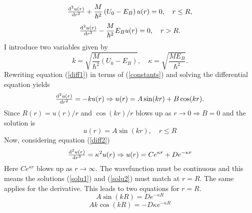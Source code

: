 \begin{equation} \label{diff1}
  \od[2]{u(r)}{r}+\frac{M}{\hbar^2} \left(U_0-E_B \right)u(r)=0, \quad r \leq R,
\end{equation}
\begin{equation} \label{diff2}
  \od[2]{u(r)}{r}-\frac{M}{\hbar^2} E_B u(r)=0, \quad r > R.
\end{equation}
I introduce two variables given by
\begin{equation} \label{constants}
  k=\sqrt{\frac{M}{\hbar^2}\left(U_0-E_B\right)}, \quad \kappa=\sqrt{\frac{M E_B}{\hbar^2}}.
\end{equation}
Rewriting equation (\ref{diff1}) in terms of (\ref{constants}) and solving the differential equation yields
  \begin{equation} \label{solu1}
  	\od[2]{u(r)}{r} = -ku(r) \Rightarrow u(r) = A\sin(kr)+B\cos(kr).
  \end{equation}
  Since $R(r) = u(r)/r$ and $\cos(kr)/r$ blows up as $r \rightarrow 0 \Rightarrow B=0$ and the solution is
  \begin{equation}
  	u(r)=A\sin(kr), \quad r \leq R
  \end{equation}
  Now, considering equation (\ref{diff2})
  \begin{equation} \label{solu2}
  	\od[2]{u(r)}{r}  = \kappa^2 u(r) \Rightarrow u(r) = Ce^{\kappa r}+De^{-\kappa r}
  \end{equation}
  Here $Ce^{\kappa r}$ blows up as $r\rightarrow \infty$. The wavefunction must be continuous and this means the solutions (\ref{solu1}) and (\ref{solu2}) must match at $r=R$. The same applies for the derivative. This leads to two equations for $r=R$.
  \begin{equation} \label{sin}
  	A\sin(kR) =De^{-\kappa R}
  \end{equation}
  \begin{equation} \label{expo}
  	Ak\cos(kR) =-D\kappa e^{-\kappa R}
  \end{equation}
